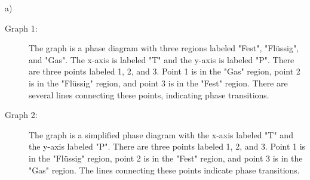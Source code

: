 a)

\begin{description}
    \item[Graph 1:] The graph is a phase diagram with three regions labeled "Fest", "Flüssig", and "Gas". The x-axis is labeled "T" and the y-axis is labeled "P". There are three points labeled 1, 2, and 3. Point 1 is in the "Gas" region, point 2 is in the "Flüssig" region, and point 3 is in the "Fest" region. There are several lines connecting these points, indicating phase transitions.
    \item[Graph 2:] The graph is a simplified phase diagram with the x-axis labeled "T" and the y-axis labeled "P". There are three points labeled 1, 2, and 3. Point 1 is in the "Flüssig" region, point 2 is in the "Fest" region, and point 3 is in the "Gas" region. The lines connecting these points indicate phase transitions.
\end{description}